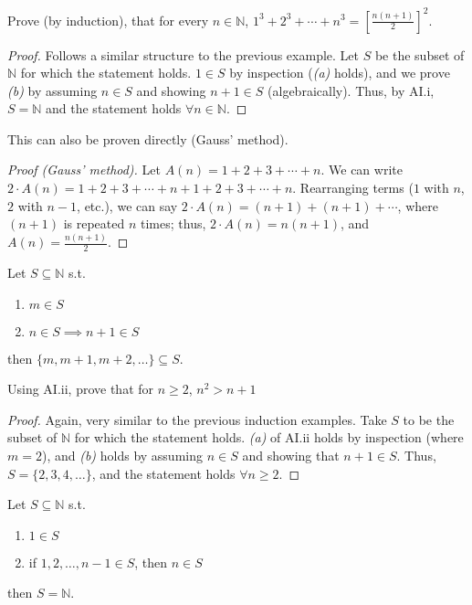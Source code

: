 \documentclass[12pt]{article}
\begin{document}
\begin{example}
  Prove (by induction), that for every $n \in \mathbb{N}$, $1^3 + 2^3 + \cdots + n^3 = \left[\frac{n(n+1)}{2}\right]^2$.
  \begin{proof}[Proof]
    Follows a similar structure to the previous example. Let $S$ be the subset of $\mathbb{N}$ for which the statement holds. $1 \in S$ by inspection (\textit{(a)} holds), and we prove \textit{(b)} by assuming $n \in S$ and showing $n+1 \in S$ (algebraically). Thus, by AI.i, $S = \mathbb{N}$ and the statement holds $\forall n \in \mathbb{N}$.
  \end{proof}
  This can also be proven directly (Gauss' method).
\begin{proof}[Proof (Gauss' method)]
  Let $A(n) = 1 + 2 + 3 + \cdots + n$. We can write $2 \cdot A(n) = 1 + 2 + 3 + \cdots + n + 1 + 2 + 3 + \cdots + n$. Rearranging terms ($1$ with $n$, $2$ with $n - 1$, etc.), we can say $2\cdot A(n) = (n+1)+(n+1)+\cdots$, where $(n+1)$ is repeated $n$ times; thus, $2\cdot A(n) = n(n+1)$, and $A(n) = \frac{n(n+1)}{2}$.
\end{proof}
\end{example}



\begin{axiom}[AI.ii]
  Let $S \subseteq \mathbb{N}$ s.t.
  \begin{enumerate}[label=(\alph*)]
    \item $m \in S$
    \item $n \in S \implies n+1 \in S$
  \end{enumerate}
  then $\{m, m+1, m+2, \dots\} \subseteq S$.
\end{axiom}

\begin{example}
  Using AI.ii, prove that for $n \geq 2$, $n^2 > n+1$
  \begin{proof}[Proof]
    Again, very similar to the previous induction examples. Take $S$ to be the subset of $\mathbb{N}$ for which the statement holds. \textit{(a)} of AI.ii holds by inspection (where $m = 2$), and \textit{(b)} holds by assuming $n \in S$ and showing that $n+1 \in S$. Thus, $S = \{2, 3, 4, \dots \}$, and the statement holds $\forall n \geq 2$.
  \end{proof}
\end{example}

\begin{axiom}
  Let $S \subseteq \mathbb{N}$ s.t.
  \begin{enumerate}[label=(\alph*)]
    \item $1 \in S$
    \item if $1, 2, \dots, n -1 \in S$, then $n \in S$
  \end{enumerate}
  then $S = \mathbb{N}$.
\end{axiom}
\end{document}
